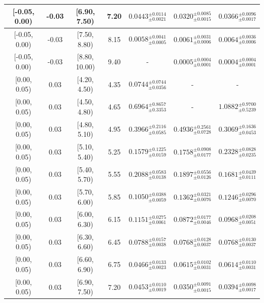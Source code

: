 \begin{longtable}{|c|c|c|c|c|c|c|}
\hline
[-0.05, 0.00) & -0.03 & [6.90, 7.50) & 7.20 & $0.0443^{ \pm 0.0114 }_{ \pm 0.0021 }$ & $0.0320^{ \pm 0.0085 }_{ \pm 0.0015 }$ & $0.0366^{ \pm 0.0096 }_{ \pm 0.0017 }$ \\ 
\hline
[-0.05, 0.00) & -0.03 & [7.50, 8.80) & 8.15 & $0.0058^{ \pm 0.0041 }_{ \pm 0.0005 }$ & $0.0061^{ \pm 0.0031 }_{ \pm 0.0006 }$ & $0.0064^{ \pm 0.0036 }_{ \pm 0.0006 }$ \\ 
\hline
[-0.05, 0.00) & -0.03 & [8.80, 10.00) & 9.40 & - & $0.0005^{ \pm 0.0004 }_{ \pm 0.0001 }$ & $0.0004^{ \pm 0.0004 }_{ \pm 0.0001 }$ \\ 
\hline
[0.00, 0.05) & 0.03 & [4.20, 4.50) & 4.35 & $0.0744^{ \pm 0.0744 }_{ \pm 0.0356 }$ & - & - \\ 
\hline
[0.00, 0.05) & 0.03 & [4.50, 4.80) & 4.65 & $0.6964^{ \pm 0.8657 }_{ \pm 0.3353 }$ & - & $1.0882^{ \pm 0.9700 }_{ \pm 0.5239 }$ \\ 
\hline
[0.00, 0.05) & 0.03 & [4.80, 5.10) & 4.95 & $0.3966^{ \pm 0.2116 }_{ \pm 0.0585 }$ & $0.4936^{ \pm 0.2561 }_{ \pm 0.0728 }$ & $0.3069^{ \pm 0.1636 }_{ \pm 0.0453 }$ \\ 
\hline
[0.00, 0.05) & 0.03 & [5.10, 5.40) & 5.25 & $0.1579^{ \pm 0.1225 }_{ \pm 0.0159 }$ & $0.1758^{ \pm 0.0908 }_{ \pm 0.0177 }$ & $0.2328^{ \pm 0.0828 }_{ \pm 0.0235 }$ \\ 
\hline
[0.00, 0.05) & 0.03 & [5.40, 5.70) & 5.55 & $0.2088^{ \pm 0.0583 }_{ \pm 0.0138 }$ & $0.1897^{ \pm 0.0556 }_{ \pm 0.0126 }$ & $0.1681^{ \pm 0.0439 }_{ \pm 0.0111 }$ \\ 
\hline
[0.00, 0.05) & 0.03 & [5.70, 6.00) & 5.85 & $0.1050^{ \pm 0.0388 }_{ \pm 0.0059 }$ & $0.1362^{ \pm 0.0321 }_{ \pm 0.0076 }$ & $0.1246^{ \pm 0.0296 }_{ \pm 0.0070 }$ \\ 
\hline
[0.00, 0.05) & 0.03 & [6.00, 6.30) & 6.15 & $0.1151^{ \pm 0.0275 }_{ \pm 0.0061 }$ & $0.0872^{ \pm 0.0177 }_{ \pm 0.0046 }$ & $0.0968^{ \pm 0.0208 }_{ \pm 0.0051 }$ \\ 
\hline
[0.00, 0.05) & 0.03 & [6.30, 6.60) & 6.45 & $0.0788^{ \pm 0.0157 }_{ \pm 0.0038 }$ & $0.0768^{ \pm 0.0128 }_{ \pm 0.0037 }$ & $0.0768^{ \pm 0.0130 }_{ \pm 0.0037 }$ \\ 
\hline
[0.00, 0.05) & 0.03 & [6.60, 6.90) & 6.75 & $0.0466^{ \pm 0.0133 }_{ \pm 0.0023 }$ & $0.0615^{ \pm 0.0102 }_{ \pm 0.0031 }$ & $0.0614^{ \pm 0.0110 }_{ \pm 0.0031 }$ \\ 
\hline
[0.00, 0.05) & 0.03 & [6.90, 7.50) & 7.20 & $0.0453^{ \pm 0.0110 }_{ \pm 0.0019 }$ & $0.0350^{ \pm 0.0091 }_{ \pm 0.0015 }$ & $0.0394^{ \pm 0.0098 }_{ \pm 0.0017 }$ \\ 

\end{longtable}
